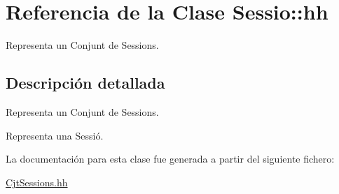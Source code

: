\hypertarget{class_sessio_1_1hh}{}\section{Referencia de la Clase Sessio\+:\+:hh}
\label{class_sessio_1_1hh}


Representa un Conjunt de Sessions.  




\subsection{Descripción detallada}
Representa un Conjunt de Sessions. 

Representa una Sessió. 

La documentación para esta clase fue generada a partir del siguiente fichero\+:\begin{DoxyCompactItemize}
\item 
\mbox{\hyperlink{_cjt_sessions_8hh}{Cjt\+Sessions.\+hh}}\end{DoxyCompactItemize}
